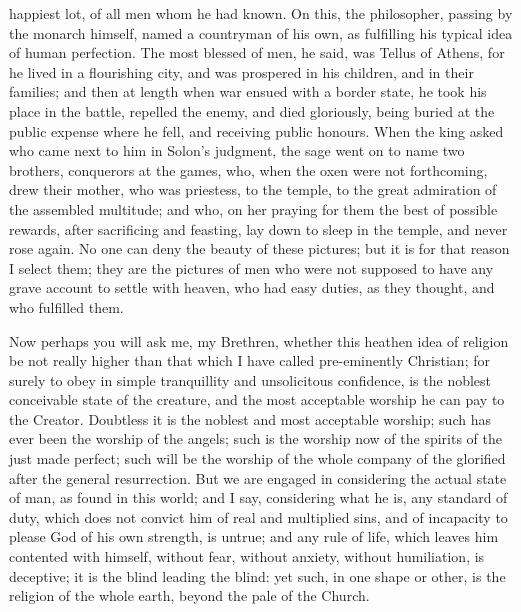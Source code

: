 happiest lot, of all men whom he had known. On this, the
philosopher, passing by the monarch himself, named a
countryman of his own, as fulfilling his typical idea of
human perfection. The most blessed of men, he said, was
Tellus of Athens, for he lived in a flourishing city, and
was prospered in his children, and in their families; and
then at length when war ensued with a border state, he
took his place in the battle, repelled the enemy, and
died gloriously, being buried at the public expense where
he fell, and receiving public honours. When the king
asked who came next to him in Solon's judgment, the sage
went on to name two brothers, conquerors at the games,
who, when the oxen were not forthcoming, drew their
mother, who was priestess, to the temple, to the great
admiration of the assembled multitude; and who, on her
praying for them the best of possible rewards, after
sacrificing and feasting, lay down to sleep in the
temple, and never rose again. No one can deny the beauty
of these pictures; but it is for that reason I select
them; they are the pictures of men who were not supposed
to have any grave account to settle with heaven, who had
easy duties, as they thought, and who fulfilled them.

Now perhaps you will ask me, my Brethren, whether this
heathen idea of religion be not really higher than that
which I have called pre-eminently Christian; for surely
to obey in simple tranquillity and unsolicitous
confidence, is the noblest conceivable state of the
creature, and the most acceptable worship he can pay to
the Creator. Doubtless it is the noblest and most
acceptable worship; such has ever been the worship of the
angels; such is the worship now of the spirits of the
just made perfect; such will be the worship of the whole
company of the glorified after the general resurrection.
But we are engaged in considering the actual state of
man, as found in this world; and I say, considering what
he is, any standard of duty, which does not convict him
of real and multiplied sins, and of incapacity to please
God of his own strength, is untrue; and any rule of life,
which leaves him contented with himself, without fear,
without anxiety, without humiliation, is deceptive; it is
the blind leading the blind: yet such, in one shape or
other, is the religion of the whole earth, beyond the
pale of the Church.

